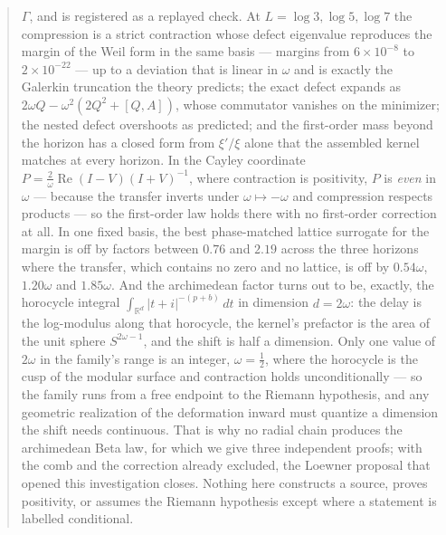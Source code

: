 \documentclass[11pt]{article}
\numberwithin{equation}{section}
\theoremstyle{definition}
\theoremstyle{remark}
\begin{document}
\begin{abstract}
$\Gamma$, and is registered as a replayed check. At $L=\log3,\log5,\log7$ the
compression is a strict contraction whose defect eigenvalue reproduces the
margin of the Weil form in the same basis --- margins from $6\times10^{-8}$ to
$2\times10^{-22}$ --- up to a deviation that is linear in $\omega$ and is
exactly the Galerkin truncation the theory predicts; the exact defect expands as
$2\omega Q-\omega^2(2Q^2+[Q,A])$, whose commutator vanishes on the minimizer;
the nested defect overshoots as predicted; and the first-order mass beyond the
horizon has a closed form from $\xi'/\xi$ alone that the assembled kernel
matches at every horizon. In the Cayley coordinate $P=\frac2\omega\operatorname{Re}(I-V)(I+V)^{-1}$,
where contraction is positivity, $P$ is \emph{even} in $\omega$ --- because the
transfer inverts under $\omega\mapsto-\omega$ and compression respects products
--- so the first-order law holds there with no first-order correction at all.
In one fixed basis, the best phase-matched lattice surrogate for the
margin is off by factors between $0.76$ and $2.19$ across the three horizons
where the transfer, which contains no zero and no lattice, is off by
$0.54\omega$, $1.20\omega$ and $1.85\omega$. And the archimedean factor turns out
to be, exactly, the horocycle integral $\int_{\mathbb R^{d}}|t+i|^{-(p+b)}\,dt$
in dimension $d=2\omega$: the delay is the log-modulus along that horocycle, the
kernel's prefactor is the area of the unit sphere $S^{2\omega-1}$, and the shift
is half a dimension. Only one value of $2\omega$ in the family's range is an
integer, $\omega=\frac12$, where the horocycle is the cusp of the modular
surface and contraction holds unconditionally --- so the family runs from a free
endpoint to the Riemann hypothesis, and any geometric realization of the
deformation inward must quantize a dimension the shift needs continuous. That is
why no radial chain produces the archimedean Beta law, for which we give three
independent proofs; with the comb and the correction already excluded, the
Loewner proposal that opened this investigation closes. Nothing here constructs a
source, proves positivity, or assumes the Riemann hypothesis except where a
statement is labelled conditional.
\end{abstract}

\clearpage
{\small\tableofcontents}
\clearpage






\appendix


\clearpage
{}
{}

\end{document}
